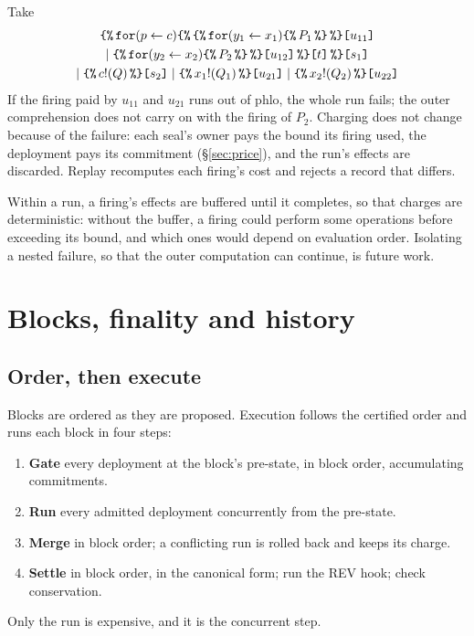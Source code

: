 \documentclass[10.5pt]{article}
\newcommand{\ob}{\texttt{\{\%}}
\newcommand{\cb}{\texttt{\%\}}}
\newcommand{\sealed}[2]{\ensuremath{\ob\,#1\,\cb\texttt{[}#2\texttt{]}}}
\begin{document}
Take
\begin{multline*}
\sealed{\mathtt{for}(p \leftarrow c)\sealed{\sealed{\mathtt{for}(y_1 \leftarrow x_1)\ob\,P_1\,\cb}{u_{11}} \\ \mid \sealed{\mathtt{for}(y_2 \leftarrow x_2)\ob\,P_2\,\cb}{u_{12}}}{t}}{s_1} \\
\mid \sealed{c!(Q)}{s_2} \mid \sealed{x_1!(Q_1)}{u_{21}} \mid \sealed{x_2!(Q_2)}{u_{22}}
\end{multline*}
If the firing paid by $u_{11}$ and $u_{21}$ runs out of phlo, the whole run fails; the outer comprehension does not carry on with the firing of $P_2$. Charging does not change because of the failure: each seal's owner pays the bound its firing used, the deployment pays its commitment (\S\ref{sec:price}), and the run's effects are discarded. Replay recomputes each firing's cost and rejects a record that differs.

Within a run, a firing's effects are buffered until it completes, so that charges are deterministic: without the buffer, a firing could perform some operations before exceeding its bound, and which ones would depend on evaluation order. Isolating a nested failure, so that the outer computation can continue, is future work.

\section{Blocks, finality and history}\label{sec:blocks}

\subsection{Order, then execute}

Blocks are ordered as they are proposed. Execution follows the certified order and runs each block in four steps:
\begin{enumerate}[label=\arabic*.]
\item \textbf{Gate} every deployment at the block's pre-state, in block order, accumulating commitments.
\item \textbf{Run} every admitted deployment concurrently from the pre-state.
\item \textbf{Merge} in block order; a conflicting run is rolled back and keeps its charge.
\item \textbf{Settle} in block order, in the canonical form; run the REV hook; check conservation.
\end{enumerate}
Only the run is expensive, and it is the concurrent step.
\end{document}
